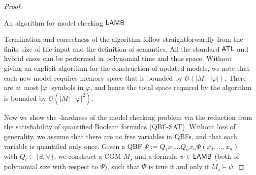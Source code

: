 {\begin{proof}
\begin{breakablealgorithm}
	\caption{An algorithm for model checking $\mathsf{LAMB}$}\label{euclid} 
	\small
	\begin{algorithmic}[1] 		
		\EndCase
		\Case {$\varphi = [\pi \cup \tau] \psi$}	
		\EndCase
  		\Case {$\varphi = [\pi;\tau] \psi$}	
		\EndCase
   \EndProcedure
   
	\end{algorithmic}
\end{breakablealgorithm}

Termination and correctness of the algorithm follow straightforwardly from the finite size of the input and the definition of semantics. All the standard $\mathsf{ATL}$ and hybrid cases can be performed in polynomial time and thus space. Without giving an explicit algorithm for the construction of updated models, we note that each new model requires memory space that is bounded by $\mathcal{O}(|M|\cdot|\varphi|)$. There are at most $|\varphi|$ symbols in $\varphi$, and hence the total space required by the algorithm is bounded by $\mathcal{O} (|M| \cdot |\varphi|^2)$.

Now we show the \Pspace-hardness of the model checking problem via the reduction from the satisfiability of quantified Boolean formulas (QBF-SAT). Without loss of generality, we assume that there are no free variables in QBFs, and that each variable is quantified only once. Given a QBF $\Psi := Q_1 x_1 ... Q_n x_n \Phi (x_1, ..., x_n)$ with $Q_i \in \{\exists, \forall\}$, we construct a CGM $M_s$ and a formula $\psi \in \mathsf{LAMB}$ (both of polynomial size with respect to $\Psi$), such that $\Psi$ is true if and only if $M_s \models \psi$.


\end{proof}}
